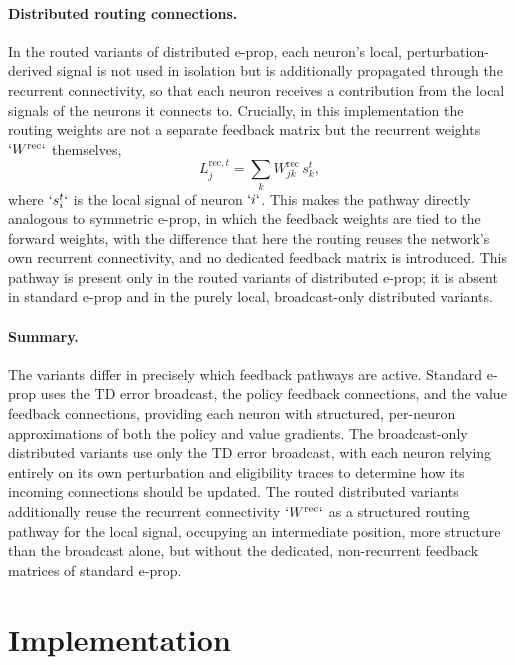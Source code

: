\paragraph{Distributed routing connections.}
In the routed variants of distributed e-prop, each neuron's local,
perturbation-derived signal is not used in isolation but is additionally
propagated through the recurrent connectivity, so that each neuron receives a
contribution from the local signals of the neurons it connects to. Crucially,
in this implementation the routing weights are not a separate feedback matrix
but the recurrent weights $`W^{\mathrm{rec}}`$ themselves,
\begin{equation}
L^{\mathrm{rec},t}_j = \sum_k W^{\mathrm{rec}}_{jk}\, s_k^t,
\end{equation}
where $`s_i^t`$ is the local signal of neuron $`i`$. This makes the pathway
directly analogous to symmetric e-prop, in which the feedback weights are tied
to the forward weights, with the difference that here the routing reuses the
network's own recurrent connectivity,
and no dedicated feedback matrix is introduced. This pathway is present only in
the routed variants of distributed e-prop; it is absent in standard e-prop and
in the purely local, broadcast-only distributed variants.

\paragraph{Summary.}
The variants differ in precisely which feedback pathways are active. Standard
e-prop uses the TD error broadcast, the policy feedback connections, and the
value feedback connections, providing each neuron with structured, per-neuron
approximations of both the policy and value gradients. The broadcast-only
distributed variants use only the TD error broadcast, with each neuron relying
entirely on its own perturbation and eligibility traces to determine how its
incoming connections should be updated. The routed distributed variants
additionally reuse the recurrent connectivity $`W^{\mathrm{rec}}`$ as a
structured routing pathway for the local signal, occupying an intermediate
position, more structure than the broadcast alone, but without the dedicated,
non-recurrent feedback matrices of standard e-prop.

\section{Implementation}
\label{sec:implementation}

